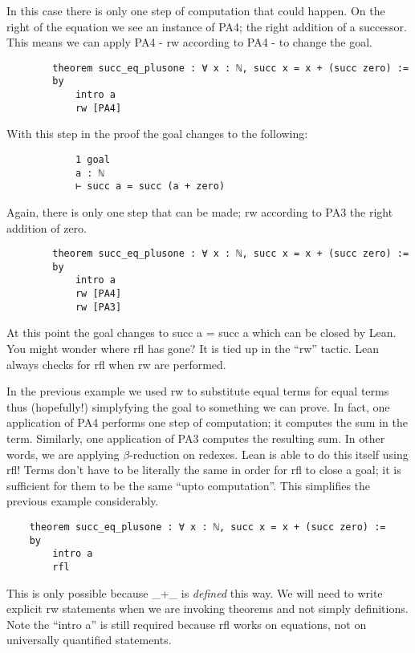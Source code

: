 \documentclass{book}
\begin{document}
\begin{eg}
    In this case there is only one step of computation that could happen. On the right of the equation we see an instance of PA4; the right addition of a successor. This means we can apply PA4 - rw according to PA4 - to change the goal. 
    \begin{center}
        \begin{lstlisting}
        theorem succ_eq_plusone : ∀ x : ℕ, succ x = x + (succ zero) :=
        by
            intro a
            rw [PA4]
        \end{lstlisting}
    \end{center}
    With this step in the proof the goal changes to the following: 
    \begin{center}
        \begin{lstlisting}
            1 goal
            a : ℕ
            ⊢ succ a = succ (a + zero)
        \end{lstlisting}
    \end{center}
    Again, there is only one step that can be made; rw according to PA3 the right addition of zero. 
    \begin{center}
        \begin{lstlisting}
        theorem succ_eq_plusone : ∀ x : ℕ, succ x = x + (succ zero) :=
        by
            intro a
            rw [PA4]
            rw [PA3]
        \end{lstlisting}
    \end{center}
    At this point the goal changes to succ a = succ a which can be closed by Lean. You might wonder where rfl has gone? It is tied up in the ``rw'' tactic. Lean always checks for rfl when rw are performed. 

\end{eg}

In the previous example we used rw to substitute equal terms for equal terms thus (hopefully!) simplyfying the goal to something we can prove. In fact, one application of PA4 performs one step of computation; it computes the sum in the term. Similarly, one application of PA3 computes the resulting sum. In other words, we are applying $\beta$-reduction on redexes. Lean is able to do this itself using rfl! Terms don't have to be literally the same in order for rfl to close a goal; it is sufficient for them to be the same ``upto computation''. This simplifies the previous example considerably. 
\begin{center}
    \begin{lstlisting}
    theorem succ_eq_plusone : ∀ x : ℕ, succ x = x + (succ zero) :=
    by
        intro a
        rfl
    \end{lstlisting}
\end{center}
This is only possible because \_+\_ is \emph{defined} this way. We will need to write explicit rw statements when we are invoking theorems and not simply definitions. Note the ``intro a'' is still required because rfl works on equations, not on universally quantified statements. 
\end{document}
